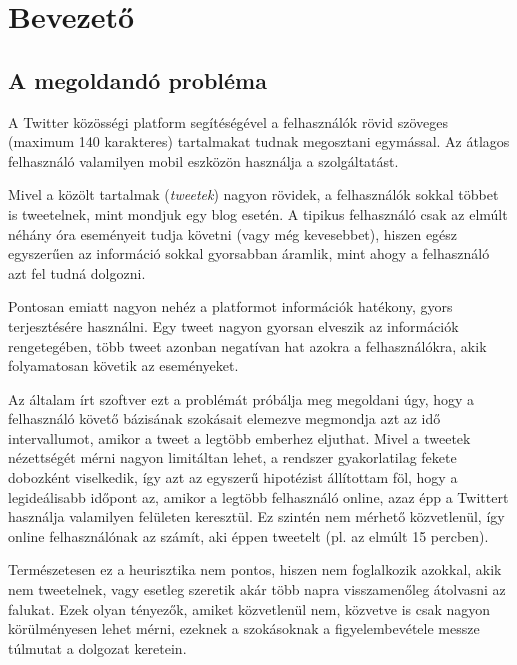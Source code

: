 \chapter{Bevezető}

\section{A megoldandó probléma}

A Twitter közösségi platform segítéségével a felhasználók rövid szöveges
(maximum 140 karakteres) tartalmakat tudnak megosztani egymással.
Az átlagos felhasználó valamilyen mobil eszközön használja a szolgáltatást.
\cite{About-Twitter}

Mivel a közölt tartalmak (\emph{tweetek}) nagyon rövidek, a felhasználók
sokkal többet is tweetelnek, mint mondjuk egy blog esetén.
A tipikus felhasználó csak az elmúlt néhány óra eseményeit tudja követni
(vagy még kevesebbet), hiszen egész egyszerűen az információ sokkal
gyorsabban áramlik, mint ahogy a felhasználó azt fel tudná dolgozni.

Pontosan emiatt nagyon nehéz a platformot információk hatékony, gyors
terjesztésére használni. Egy tweet nagyon gyorsan elveszik az információk
rengetegében, több tweet azonban negatívan hat azokra a felhasználókra,
akik folyamatosan követik az eseményeket.

Az általam írt szoftver ezt a problémát próbálja meg megoldani úgy,
hogy a felhasználó követő bázisának szokásait elemezve megmondja azt az
idő intervallumot, amikor a tweet a legtöbb emberhez eljuthat.
Mivel a tweetek nézettségét mérni nagyon limitáltan lehet,
a rendszer gyakorlatilag fekete dobozként viselkedik,
így azt az egyszerű hipotézist állítottam föl,
hogy a legideálisabb időpont az, amikor a legtöbb felhasználó online,
azaz épp a Twittert használja valamilyen felületen keresztül.
Ez szintén nem mérhető közvetlenül, így online felhasználónak az számít,
aki éppen tweetelt (pl. az elmúlt 15 percben).

Természetesen ez a heurisztika nem pontos, hiszen nem foglalkozik azokkal,
akik nem tweetelnek, vagy esetleg szeretik akár több napra visszamenőleg
átolvasni az falukat. Ezek olyan tényezők, amiket közvetlenül nem,
közvetve is csak nagyon körülményesen lehet mérni, ezeknek a szokásoknak
a figyelembevétele messze túlmutat a dolgozat keretein.

